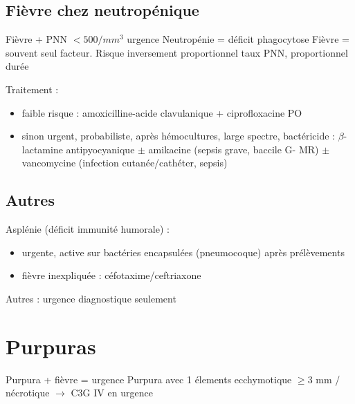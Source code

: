 \subsection{Fièvre chez neutropénique}
\label{sec:org077134a}
Fièvre + PNN \(< 500/mm^3\) urgence \skull
Neutropénie = déficit phagocytose
Fièvre = souvent seul facteur.
Risque inversement proportionnel taux PNN, proportionnel durée

Traitement :
\begin{itemize}
\item faible risque : amoxicilline-acide clavulanique + ciprofloxacine PO
\item sinon urgent, probabiliste, après hémocultures, large spectre, bactéricide : \(\beta\)-lactamine antipyocyanique \(\pm\) amikacine (sepsis grave, baccile G- MR) \(\pm\) vancomycine (infection cutanée/cathéter, sepsis)
\end{itemize}


\subsection{Autres}
\label{sec:org8c06c0e}
Asplénie (déficit immunité humorale) : 
\begin{itemize}
\item urgente, active sur bactéries encapsulées (pneumocoque) après prélèvements
\item fièvre inexpliquée : céfotaxime/ceftriaxone
\end{itemize}
Autres : urgence diagnostique seulement

\section{Purpuras}
\label{sec:orga164eae}
\danger Purpura + fièvre = urgence 
\danger Purpura avec 1 élements ecchymotique $\ge 3$ mm / nécrotique $\to$ C3G
IV en urgence \skull

